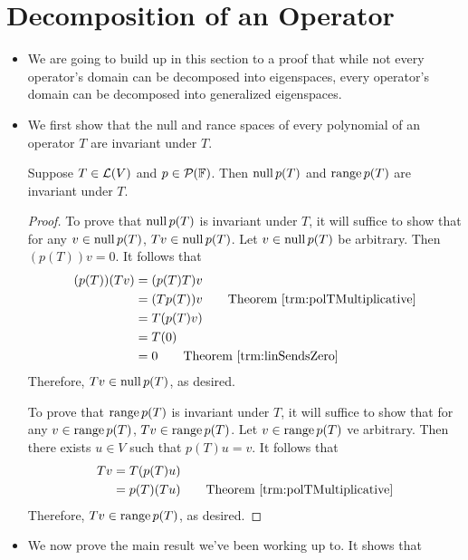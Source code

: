 \documentclass[../main.tex]{subfiles}
\begin{document}
\section{Decomposition of an Operator}
\begin{itemize}
    \item {}We are going to build up in this section to a proof that while not every operator's domain can be decomposed into eigenspaces, every operator's domain can be decomposed into generalized eigenspaces.
    \item We first show that the null and rance spaces of every polynomial of an operator $T$ are invariant under $T$.
    \begin{theorem}\label{trm:polTinvariant}
        Suppose $T\in\mathcal{L}(V)$ and $p\in\mathcal{P}_{}(\mathbb{F})$. Then $\operatorname{null} p(T)$ and $\operatorname{range} p(T)$ are invariant under $T$.
        \begin{proof}
            To prove that $\operatorname{null} p(T)$ is invariant under $T$, it will suffice to show that for any $v\in\operatorname{null} p(T)$, $Tv\in\operatorname{null} p(T)$. Let $v\in\operatorname{null} p(T)$ be arbitrary. Then $(p(T))v=0$. It follows that
            \begin{align*}
                (p(T))(Tv) &= (p(T)T)v\\
                &= (Tp(T))v\tag*{Theorem \ref{trm:polTMultiplicative}}\\
                &= T(p(T)v)\\
                &= T(0)\\
                &= 0\tag*{Theorem \ref{trm:linSendsZero}}
            \end{align*}
            Therefore, $Tv\in\operatorname{null} p(T)$, as desired.\par
            To prove that $\operatorname{range} p(T)$ is invariant under $T$, it will suffice to show that for any $v\in\operatorname{range} p(T)$, $Tv\in\operatorname{range} p(T)$. Let $v\in\operatorname{range} p(T)$ ve arbitrary. Then there exists $u\in V$ such that $p(T)u=v$. It follows that
            \begin{align*}
                Tv &= T(p(T)u)\\
                &= p(T)(Tu)\tag*{Theorem \ref{trm:polTMultiplicative}}
            \end{align*}
            Therefore, $Tv\in\operatorname{range} p(T)$, as desired.
        \end{proof}
    \end{theorem}
    \item We now prove the main result we've been working up to. It shows that 

\end{itemize}
\end{document}
